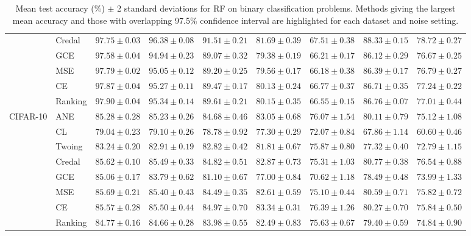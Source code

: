 \documentclass[letterpaper]{article} %
\begin{document}
\begin{table}[t]
\begin{tabular}{clccccccc}
 & Credal & $97.75 \pm 0.03$ & $\mathbf{96.38 \pm 0.08}$ & $\mathbf{91.51 \pm 0.21}$ & $81.69 \pm 0.39$ & $67.51 \pm 0.38$ & $\mathbf{88.33 \pm 0.15}$ & $\mathbf{78.72 \pm 0.27}$ \\
 & GCE    & $97.58 \pm 0.04$ & $94.94 \pm 0.23$ & $89.07 \pm 0.32$ & $79.38 \pm 0.19$ & $66.21 \pm 0.17$ & $86.12 \pm 0.29$ & $76.67 \pm 0.25$ \\
 & MSE    & $97.79 \pm 0.02$ & $95.05 \pm 0.12$ & $89.20 \pm 0.25$ & $79.56 \pm 0.17$ & $66.18 \pm 0.38$ & $86.39 \pm 0.17$ & $76.79 \pm 0.27$ \\
 & CE     & $\mathbf{97.87 \pm 0.04}$ & $95.27 \pm 0.11$ & $89.47 \pm 0.17$ & $80.13 \pm 0.24$ & $66.77 \pm 0.37$ & $86.71 \pm 0.35$ & $\mathbf{77.24 \pm 0.22}$ \\
 & Ranking & $\mathbf{97.90 \pm 0.04}$ & $95.34 \pm 0.14$ & $89.61 \pm 0.21$ & $80.15 \pm 0.35$ & $66.55 \pm 0.15$ & $86.76 \pm 0.07$ & $\mathbf{77.01 \pm 0.44}$ \\
\hline
\multirow{8}{*}{CIFAR-10}
 & ANE    & $85.28 \pm 0.28$ & $\mathbf{85.23 \pm 0.26}$ & $\mathbf{84.68 \pm 0.46}$ & $\mathbf{83.05 \pm 0.68}$ & $\mathbf{76.07 \pm 1.54}$ & $\mathbf{80.11 \pm 0.79}$ & $\mathbf{75.12 \pm 1.08}$ \\
 & CL     & $79.04 \pm 0.23$ & $79.10 \pm 0.26$ & $78.78 \pm 0.92$ & $77.30 \pm 0.29$ & $72.07 \pm 0.84$ & $67.86 \pm 1.14$ & $60.60 \pm 0.46$ \\
 & Twoing & $83.24 \pm 0.20$ & $82.91 \pm 0.19$ & $82.82 \pm 0.42$ & $81.81 \pm 0.67$ & $\mathbf{75.87 \pm 0.80}$ & $77.32 \pm 0.40$ & $72.79 \pm 1.15$ \\
 & Credal & $\mathbf{85.62 \pm 0.10}$ & $\mathbf{85.49 \pm 0.33}$ & $\mathbf{84.82 \pm 0.51}$ & $\mathbf{82.87 \pm 0.73}$ & $\mathbf{75.31 \pm 1.03}$ & $\mathbf{80.77 \pm 0.38}$ & $\mathbf{76.54 \pm 0.88}$ \\
 & GCE    & $85.06 \pm 0.17$ & $83.79 \pm 0.62$ & $81.10 \pm 0.67$ & $77.00 \pm 0.84$ & $70.62 \pm 1.18$ & $78.49 \pm 0.48$ & $73.99 \pm 1.33$ \\
 & MSE    & $\mathbf{85.69 \pm 0.21}$ & $\mathbf{85.40 \pm 0.43}$ & $\mathbf{84.49 \pm 0.35}$ & $82.61 \pm 0.59$ & $\mathbf{75.10 \pm 0.44}$ & $\mathbf{80.59 \pm 0.71}$ & $\mathbf{75.82 \pm 0.72}$ \\
 & CE     & $\mathbf{85.57 \pm 0.28}$ & $\mathbf{85.50 \pm 0.44}$ & $\mathbf{84.97 \pm 0.70}$ & $\mathbf{83.34 \pm 0.31}$ & $\mathbf{76.39 \pm 1.26}$ & $\mathbf{80.27 \pm 0.70}$ & $\mathbf{75.84 \pm 0.50}$ \\
 & Ranking & $84.77 \pm 0.16$ & $84.66 \pm 0.28$ & $83.98 \pm 0.55$ & $\mathbf{82.49 \pm 0.83}$ & $\mathbf{75.63 \pm 0.67}$ & $79.40 \pm 0.59$ & $74.84 \pm 0.90$ \\
\hline
\end{tabular}
\caption{Mean test accuracy (\%) $\pm$ 2 standard deviations for RF on binary classification problems. Methods giving the largest mean accuracy and those with overlapping 97.5\% confidence interval are highlighted for each dataset and noise setting.}
\label{tab:rf-bin}
\end{table}
\end{document}
